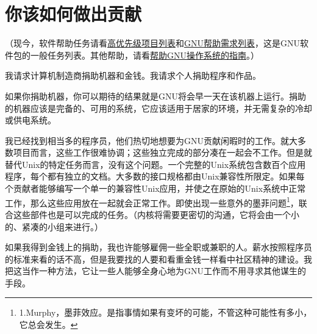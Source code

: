 \section{你该如何做出贡献}
（现今，软件帮助任务请看\href{http://fsf.org/campaigns/priority-projects}{高优先级项目列表}和\href{http://savannah.gnu.org/people/?type_id=1}{GNU帮助需求列表}，这是GNU软件包的一般任务列表。其他帮助，请看\href{http://www.gnu.org/help/help.html}{帮助GNU操作系统的指南}。）\par
我请求计算机制造商捐助机器和金钱。我请求个人捐助程序和作品。\par
如果你捐助机器，你可以期待的结果就是GNU将会早一天在该机器上运行。捐助的机器应该是完备的、可用的系统，它应该适用于居家的环境，并无需复杂的冷却或供电系统。\par
我已经找到相当多的程序员，他们热切地想要为GNU贡献闲暇时的工作。就大多数项目而言，这些工作很难协调；这些独立完成的部分凑在一起会不工作。但是就替代Unix的特定任务而言，没有这个问题。一个完整的Unix系统包含数百个应用程序，每个都有独立的文档。大多数的接口规格都由Unix兼容性所限定。如果每个贡献者能够编写一个单一的兼容性Unix应用，并使之在原始的Unix系统中正常工作，那么这些应用放在一起就会正常工作。即使出现一些意外的墨菲问题\footnote{1.Murphy，墨菲效应。是指事情如果有变坏的可能，不管这种可能性有多小，它总会发生。}，联合这些部件也是可以完成的任务。（内核将需要更密切的沟通，它将会由一个小的、紧凑的小组来进行。）\par
如果我得到金钱上的捐助，我也许能够雇佣一些全职或兼职的人。薪水按照程序员的标准来看的话不高，但是我要找的人要和看重金钱一样看中社区精神的建设。我把这当作一种方法，它让一些人能够全身心地为GNU工作而不用寻求其他谋生的手段。
